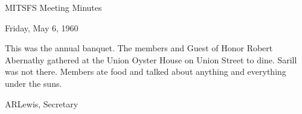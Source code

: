 \documentclass[12pt]{article}
\begin{document}
\begin{center}

MITSFS Meeting Minutes

Friday, May 6, 1960

\end{center}
 
\vspace{12pt}

\setlength{\parskip}{6pt}

\noindent
This was the annual banquet. The members and Guest of Honor Robert Abernathy gathered at the Union Oyster House on Union Street to dine. Sarill was not there. Members ate food and talked about anything and everything under the suns.

\vspace{12pt}

\centerline{ARLewis, Secretary}
\end{document}
